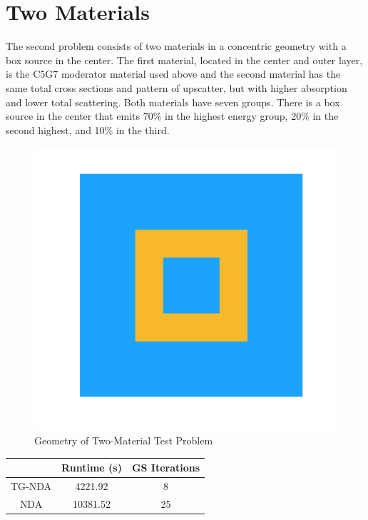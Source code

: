 \section{Two Materials}
The second problem consists of two materials in a concentric geometry with a box source in the center. The first material, located in the center and outer layer, is the C5G7 moderator material used above and the second material has the same total cross sections and pattern of upscatter, but with higher absorption and lower total scattering. Both materials have seven groups. There is a box source in the center that emits 70\% in the highest energy group, 20\% in the second highest, and 10\% in the third.
\begin{figure}[H]
    \centering
    \includegraphics[width=.3\textwidth]{fig/Geometry.png}
    \caption{Geometry of Two-Material Test Problem}
    \label{fig:test_geometry}
\end{figure}

\begin{center}
    \begin{tabular}{|c|c|c|}
    \hline
    & Runtime (s) & GS Iterations \\
    \hline
    TG-NDA & 4221.92 & 8 \\
    NDA & 10381.52 & 25 \\
    \hline
    \end{tabular}
\end{center}

